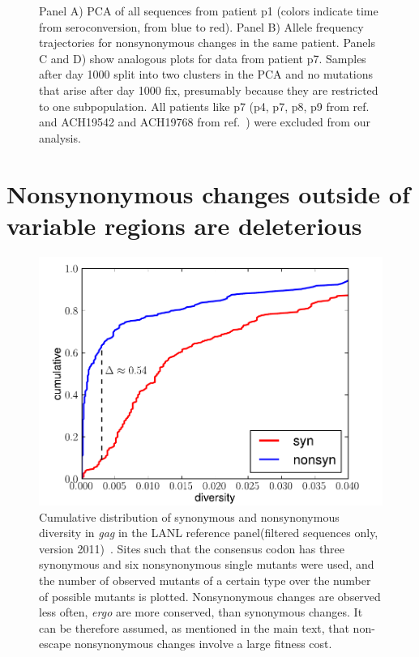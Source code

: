 \documentclass[rmp]{revtex4}
\begin{document}
\begin{figure}[ht]
\begin{center}
\caption{Panel A) PCA of all sequences from patient p1 (colors indicate time from seroconversion,
from blue to red). Panel B) Allele frequency trajectories for nonsynonymous
changes in the same patient. Panels C and D) show analogous plots for data from
patient p7. Samples after day 1000 split into two clusters in the PCA and no
mutations that arise after day 1000 fix, presumably because they are restricted
to one subpopulation. All patients like p7 (p4, p7, p8, p9 from ref.~\citealp{shankarappa_consistent_1999} and
ACH19542 and ACH19768 from ref.~\citealp{bunnik_autologous_2008}) were excluded
from our analysis.}
\label{fig:aftp}
\end{center}
\end{figure}

\section{Nonsynonymous changes outside of variable regions are deleterious}
\begin{figure}[h]
\begin{center}
\includegraphics[width=0.5\linewidth]{synmut_conservation_4fold_synnonsyn}
\caption{Cumulative distribution of synonymous and nonsynonymous diversity in
{\it gag} in the LANL reference panel(filtered
sequences only, version 2011)~\cite{LANL2012}. Sites such that the consensus codon
has three synonymous and six nonsynonymous single mutants were used, and the number of observed mutants
of a certain type over the number of possible mutants is plotted. Nonsynonymous
changes are observed less often, {\it ergo} are more conserved, than
synonymous changes. It can be therefore assumed, as mentioned in the main text,
that non-escape nonsynonymous changes involve a large fitness cost.}
\label{fig:synnonsyncons}
\end{center}
\end{figure}
\end{document}
